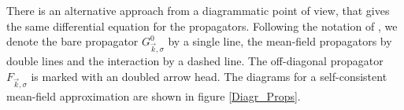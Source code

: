 \documentclass[a4paper,12pt]{report}
\begin{document}

There is an alternative approach from a diagrammatic point of view, that gives the same differential equation for the propagators.
Following the notation of \cite{PhysRevB.65.132404}, 
we denote the bare propagator $G^0_{\vec k,\sigma}$ by a single line, the mean-field propagators by double lines and the interaction by a dashed line.
The off-diagonal propagator $F_{\vec k ,\sigma}$ is marked with an doubled arrow head.
The diagrams for a self-consistent mean-field approximation are shown in figure \ref{Diagr_Props}. 
\end{document}
